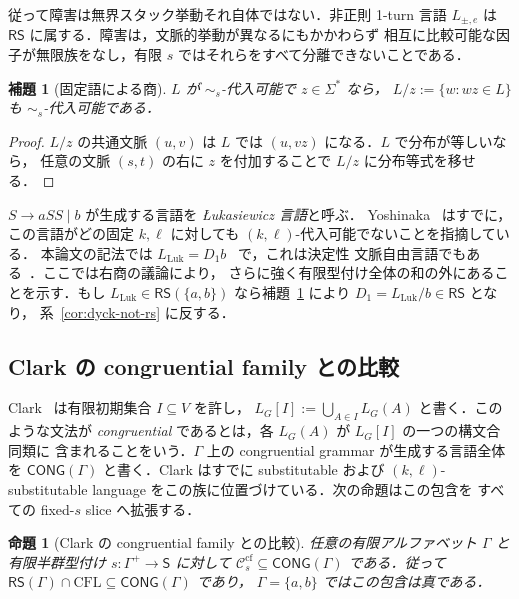 \documentclass[11pt,a4paper]{ltjsarticle}
\newtheorem{lemma}[theorem]{補題}
\newtheorem{proposition}[theorem]{命題}
\theoremstyle{remark}
\theoremstyle{plain}
\newcommand{\cf}{\mathrm{cf}}
\newcommand{\Ccf}[1]{\mathcal C_{#1}^{\cf}}
\begin{document}
従って障害は無界スタック挙動それ自体ではない．非正則 1-turn 言語
$L_{\pm,e}$ は $\mathsf{RS}$ に属する．障害は，文脈的挙動が異なるにもかかわらず
相互に比較可能な因子が無限族をなし，有限 $s$ ではそれらをすべて分離できないことである．

\begin{lemma}[固定語による商]\label{lem:rs-fixed-quotient}
$L$ が $\sim_s$-代入可能で $z\in\Sigma^*$ なら，
$L/z:=\{w:wz\in L\}$ も $\sim_s$-代入可能である．
\end{lemma}
\begin{proof}
$L/z$ の共通文脈 $(u,v)$ は $L$ では $(u,vz)$ になる．$L$ で分布が等しいなら，
任意の文脈 $(s,t)$ の右に $z$ を付加することで $L/z$ に分布等式を移せる．
\end{proof}

$S\to aSS\mid b$ が生成する言語を \emph{Łukasiewicz 言語}と呼ぶ．
Yoshinaka~\cite[Section~3]{yoshinaka2008} はすでに，この言語がどの固定
$k,\ell$ に対しても $(k,\ell)$-代入可能でないことを指摘している．
本論文の記法では $L_{\mathrm{Luk}}=D_1b$~\cite{autebert1997} で，これは決定性
文脈自由言語でもある~\cite{ginsburg-greibach1966}．ここでは右商の議論により，
さらに強く有限型付け全体の和の外にあることを示す．もし
$L_{\mathrm{Luk}}\in\mathsf{RS}(\{a,b\})$ なら補題~\ref{lem:rs-fixed-quotient} により
$D_1=L_{\mathrm{Luk}}/b\in\mathsf{RS}$ となり，
系~\ref{cor:dyck-not-rs} に反する．

\subsection{Clark の congruential family との比較}

Clark~\cite{clark2010congruential} は有限初期集合 $I\subseteq V$ を許し，
$L_G[I]:=\bigcup_{A\in I}L_G(A)$ と書く．このような文法が
\emph{congruential} であるとは，各 $L_G(A)$ が $L_G[I]$ の一つの構文合同類に
含まれることをいう．$\Gamma$ 上の congruential grammar が生成する言語全体を
$\mathsf{CONG}(\Gamma)$ と書く．Clark はすでに substitutable および
$(k,\ell)$-substitutable language をこの族に位置づけている．次の命題はこの包含を
すべての fixed-$s$ slice へ拡張する．

\begin{proposition}[Clark の congruential family との比較]
\label{prop:clark-congruential-comparison}
任意の有限アルファベット $\Gamma$ と有限半群型付け
$s:\Gamma^+\to\mathsf S$ に対して
$\Ccf{s}\subseteq\mathsf{CONG}(\Gamma)$ である．従って
$\mathsf{RS}(\Gamma)\cap\mathrm{CFL}\subseteq\mathsf{CONG}(\Gamma)$ であり，
$\Gamma=\{a,b\}$ ではこの包含は真である．
\end{proposition}
\end{document}
